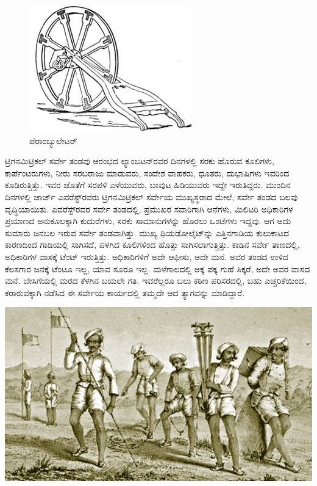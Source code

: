 \begin{figure}[!htbp]
\includegraphics[scale=0.65]{"images/image008.jpg"}
\caption{ಪೆರಾಂಬ್ಯುಲೇಟರ್​}\label{art5-fig2}
\end{figure}

ಟ್ರಿಗನಮಿಟ್ರಿಕಲ್​ ಸರ್ವೇ ತಂಡವು ಆರಂಭದ ಲ್ಯಾಂಬಟನ್​ರವರ ದಿನಗಳಲ್ಲಿ ಸರಕು ಹೊರುವ ಕೂಲಿಗಳು, ಕಾರ್ಪೆಂಟರುಗಳು, ನೀರು ಸರಬರಾಜು ಮಾಡುವರು, ಸಂದೇಶ ವಾಹಕರು, ಧೂತರು, ದುಭಾಷಿಗಳು ಇವರಿಂದ ಕೂಡಿರುತ್ತಿತ್ತು. ಇವರ ಜೊತೆಗೆ ಸರಪಳಿ ಎಳೆಯುವರು, ಬಾವುಟ ಹಿಡಿಯುವರು ಇದ್ದೇ ಇರುತಿದ್ದರು. ಮುಂದಿನ ದಿನಗಳಲ್ಲಿ ಜಾರ್ಜ್ ಎವರೆಸ್ಟ್​ರವರು ಟ್ರಿಗನಮಿಟ್ರಿಕಲ್​ ಸರ್ವೇಯ ಮುಖ್ಯಸ್ಥರಾದ ಮೇಲೆ, ಸರ್ವೇ ತಂಡದ ಬಲವು ವೃದ್ಧಿಯಾಯಿತು. ಎವರೆಸ್ಟ್​ರವರ ಸರ್ವೇ ತಂಡದಲ್ಲಿ, ಪ್ರಮುಖರ ಸವಾರಿಗಾಗಿ  ಆನೆಗಳು, ಮಿಲಿಟರಿ ಅಧಿಕಾರಿಗಳ ಪ್ರಯಾಣದ ಅನುಕೂಲಕ್ಕಾಗಿ  ಕುದುರೆಗಳು, ಸರಕು ಸಾಮಾನುಗಳನ್ನು ಹೊರಲು  ಒಂಟೆಗಳು ಇದ್ದವು. ಆಗ ಅದು ಸುಮಾರು  ಜನಬಲ ಇರುವ ಸರ್ವೇ ತಂಡವಾಗಿತ್ತು. ಮುಖ್ಯ ಥಿಯಡೋಲೈಟ್​ನ್ನು ಎತ್ತಿನಗಾಡಿಯ ಕುಲುಕಾಟದ ಕಾರಣದಿಂದ ಗಾಡಿಯಲ್ಲಿ ಸಾಗಿಸದೆ, ಪಳಗಿದ ಕೂಲಿಗಳಿಂದ ಹೊತ್ತು ಸಾಗಿಸಲಾಗುತ್ತಿತ್ತು. ಕಾಡಿನ ಸರ್ವೇ ತಾಣದಲ್ಲಿ, ಅಧಿಕಾರಿಗಳ ವಾಸಕ್ಕೆ ಟೆಂಟ್​ ಇರುತ್ತಿತ್ತು. ಅಧಿಕಾರಿಗಳಿಗೆ ಅದೇ ಆಫೀಸು, ಅದೇ ಮನೆ. ಅವರ ತಂಡದ ಉಳಿದ ಕೆಲಸಗಾರ ಜನಕ್ಕೆ ಟೆಂಟೂ ಇಲ್ಲ, ಯಾವ ಸೂರೂ ಇಲ್ಲ. ಮಳೆಗಾಲದಲ್ಲಿ ಅಕ್ಕ ಪಕ್ಕ ಗುಹೆ ಸಿಕ್ಕರೆ, ಅದೇ ಅವರ ವಾಸದ ಮನೆ. ಬೇಸಿಗೆಯಲ್ಲಿ ಮರದ ಕೆಳಗಿನ ಬಯಲೇ ಗತಿ. ಇವರೆಲ್ಲರೂ ಬಲು ಕಠಿಣ ಪರಿಸರದಲ್ಲಿ, ಬಹು ಎಚ್ಚರಿಕೆಯಿಂದ, ಕರಾರುವಕ್ಕಾಗಿ ನಡೆಸಿದ ಈ ಸರ್ವೇಯ ಕಾರ್ಯದಲ್ಲಿ ತಮ್ಮದೇ ಆದ ತ್ಯಾಗವನ್ನು ಮಾಡಿದ್ದಾರೆ.

\begin{center}
\includegraphics[scale=0.48]{"images/image009.jpg"}
\end{center}

